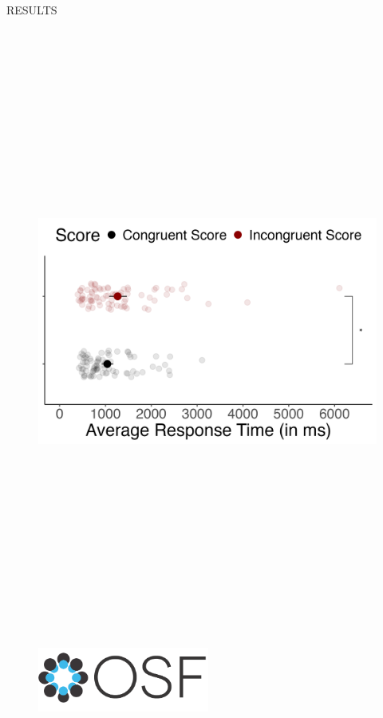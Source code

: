 \documentclass[final]{beamer}
\newlength{\colwidth}
\newlength{\widecolwidth}
\begin{document}
\begin{frame}[t]
\begin{columns}[t]
\begin{column}{\widecolwidth}
\begin{block}{RESULTS}
\begin{minipage}{0.55\textwidth}
    \begin{figure}
      \centering
      \includegraphics[height=20cm]{plots/figure1.png}
    \end{figure}
\end{minipage}%
\begin{minipage}{0.45\textwidth}
\begin{figure}
      \centering
      \href{https://aspredicted.org/DJG_YWR}{\includegraphics[height=2.125cm]{images/osf.png}}

\end{figure}
\end{minipage}
\end{block}
\end{column}
\end{columns}
\end{frame}
\end{document}
